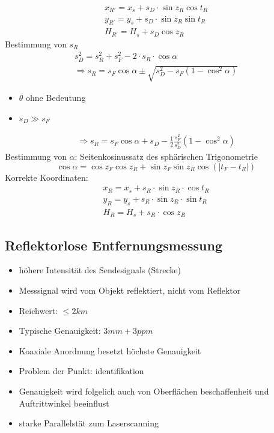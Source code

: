 \documentclass[12pt]{article}
\begin{document}
\begin{gather*}
	x_{R'} = x_s + s_D \cdot \sin z_R \cos t_R \\
	y_{R'} = y_s + s_D \cdot \sin z_R \sin t_R \\
	H_{R'} = H_s + s_D \cos z_R
\end{gather*}
Bestimmung von $s_R$
\begin{gather*}
	s_D^2 = s_R^2 + s_F^2 - 2 \cdot s_R \cdot \cos \alpha \\
	\Rightarrow s_R = s_F \cos \alpha \pm \sqrt{s_D^2 - s_F (1 - \cos^2\alpha)}
\end{gather*}
\begin{itemize}
	\item $\theta$ ohne Bedeutung
	\item $s_D \gg s_F$
\end{itemize}
\begin{gather*}
	\Longrightarrow s_R = s_F \cos \alpha + s_D - \frac{1}{2} \frac{s_F^2}{s_D^2} (1 - \cos^2 \alpha)
\end{gather*}
Bestimmung von $\alpha$: \newline
Seitenkosinussatz des sphärischen Trigonometrie
\begin{equation*}
	\cos \alpha = \cos z_F \cos z_R + \sin z_F \sin z_R  \cos (|t_F - t_R|)
\end{equation*}
Korrekte Koordinaten:
\begin{gather*}
	x_R = x_s + s_R \cdot \sin z_R \cdot \cos t_R \\
	y_R = y_s + s_R \cdot \sin z_R \cdot \sin t_R \\
	H_R = H_s + s_R \cdot \cos z_R
\end{gather*}
\subsection{Reflektorlose Entfernungsmessung}
\begin{itemize}
	\item höhere Intensität des Sendesignals (Strecke)
	\item Messsignal wird vom Objekt reflektiert, nicht vom Reflektor
	\item Reichwert: $\leq 2km$
	\item Typische Genauigkeit: $3mm + 3ppm$
	\item Koaxiale Anordnung besetzt höchste Genauigkeit 
	\item Problem der Punkt: identifikation
	\item Genauigkeit wird folgelich auch von Oberflächen beschaffenheit und Auftrittwinkel beeinflust
	\item starke Parallelstät zum Laserscanning
\end{itemize}
\end{document}
